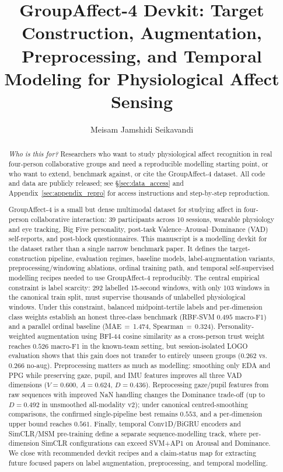 \documentclass[sigconf,nonacm]{acmart}
\title{GroupAffect-4 Devkit: Target Construction, Augmentation, Preprocessing,
       and Temporal Modeling for Physiological Affect Sensing}
\author{Meisam Jamshidi Seikavandi}
\affiliation{%
  \institution{CogniSense Lab, GN Hearing}
  \city{Copenhagen}
  \country{Denmark}}
\begin{document}
\setlength{\emergencystretch}{40pt}  %

\begin{abstract}
\noindent\textit{Who is this for?}
Researchers who want to study physiological affect recognition in real
four-person collaborative groups and need a reproducible modelling starting
point, or who want to extend, benchmark against, or cite the GroupAffect-4
dataset.
All code and data are publicly released; see \S\ref{sec:data_access} and
Appendix~\ref{sec:appendix_repro} for access instructions and
step-by-step reproduction.

GroupAffect-4 is a small but dense multimodal dataset for studying affect in
four-person collaborative interaction: 39 participants across 10 sessions,
wearable physiology and eye tracking, Big Five personality, post-task
Valence--Arousal--Dominance (VAD) self-reports, and post-block questionnaires.
This manuscript is a modelling devkit for the dataset rather than a single
narrow benchmark paper.
It defines the target-construction pipeline, evaluation regimes, baseline
models, label-augmentation variants, preprocessing/windowing ablations, ordinal
training path, and temporal self-supervised modelling recipes needed to use
GroupAffect-4 reproducibly.
The central empirical constraint is label scarcity: 292 labelled 15-second
windows, with only 103 windows in the canonical train split, must supervise
thousands of unlabelled physiological windows.
Under this constraint, balanced midpoint-tertile labels and per-dimension class
weights establish an honest three-class benchmark (RBF-SVM $0.495$ macro-F1)
and a parallel ordinal baseline (MAE\,$=$\,1.474, Spearman\,$=$\,0.324).
Personality-weighted augmentation using BFI-44 cosine similarity as a
cross-person trust weight reaches $0.526$ macro-F1 in the known-team setting,
but session-isolated LOGO evaluation shows that this gain does not transfer to
entirely unseen groups ($0.262$ vs.\ $0.266$ no-aug).
Preprocessing matters as much as modelling: smoothing only EDA and PPG while
preserving gaze, pupil, and IMU features improves all three VAD dimensions
($V{=}0.600$, $A{=}0.624$, $D{=}0.436$).
Reprocessing gaze/pupil features from raw sequences with improved NaN handling
changes the Dominance trade-off (up to $D{=}0.492$ in unsmoothed all-modality
v2); under canonical centred-smoothing comparisons, the confirmed
single-pipeline best remains $0.553$, and a per-dimension upper bound reaches
$0.561$.
Finally, temporal Conv1D/BiGRU encoders and SimCLR/MSM pre-training define a
separate sequence-modelling track, where per-dimension SimCLR configurations
can exceed SVM+AP1 on Arousal and Dominance.
We close with recommended devkit recipes and a claim-status map for extracting
future focused papers on label augmentation, preprocessing, and temporal
modelling.
\end{abstract}
\end{document}
